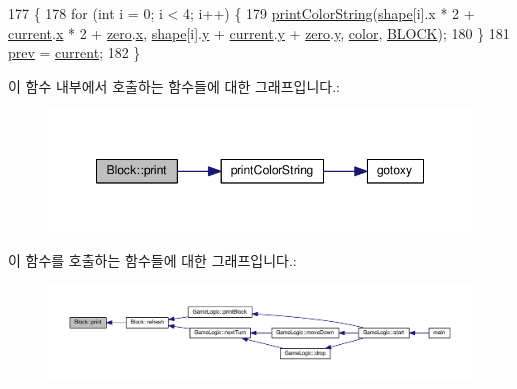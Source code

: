 \begin{DoxyCode}
177                   \{
178     \textcolor{keywordflow}{for} (\textcolor{keywordtype}{int} i = 0; i < 4; i++) \{
179         \hyperlink{myio_8cpp_afce36429cc875312f4476969820ebb51}{printColorString}(\hyperlink{class_block_ae1a4e97236e1e5f04d21fc9227b8c3a8}{shape}[i].x * 2 + \hyperlink{class_block_aeb5dd312b719966752ba4b38720a4535}{current}.\hyperlink{struct_point_a8c779e11e694b20e0946105a9f5de842}{x} * 2 + 
      \hyperlink{class_block_ad456f4794a480711f7057e1f270d93c2}{zero}.\hyperlink{struct_point_a8c779e11e694b20e0946105a9f5de842}{x}, \hyperlink{class_block_ae1a4e97236e1e5f04d21fc9227b8c3a8}{shape}[i].\hyperlink{struct_point_a2e1b5fb2b2a83571f5c0bc0f66a73cf7}{y} + \hyperlink{class_block_aeb5dd312b719966752ba4b38720a4535}{current}.\hyperlink{struct_point_a2e1b5fb2b2a83571f5c0bc0f66a73cf7}{y} + \hyperlink{class_block_ad456f4794a480711f7057e1f270d93c2}{zero}.\hyperlink{struct_point_a2e1b5fb2b2a83571f5c0bc0f66a73cf7}{y}, \hyperlink{class_block_a11fa34418f20b6613d0ceeea8fc71d25}{color}, 
      \hyperlink{class_block_a4cb64c2c20884eed68c24c6147f68514}{BLOCK});
180     \}
181     \hyperlink{class_block_ab86ce4753987a3eb39058553fd81b462}{prev} = \hyperlink{class_block_aeb5dd312b719966752ba4b38720a4535}{current};
182 \}
\end{DoxyCode}


이 함수 내부에서 호출하는 함수들에 대한 그래프입니다.\+:
\nopagebreak
\begin{figure}[H]
\begin{center}
\leavevmode
\includegraphics[width=348pt]{class_block_a7ea913786e48c140a2a35ff03c35746c_cgraph}
\end{center}
\end{figure}




이 함수를 호출하는 함수들에 대한 그래프입니다.\+:
\nopagebreak
\begin{figure}[H]
\begin{center}
\leavevmode
\includegraphics[width=350pt]{class_block_a7ea913786e48c140a2a35ff03c35746c_icgraph}
\end{center}
\end{figure}


